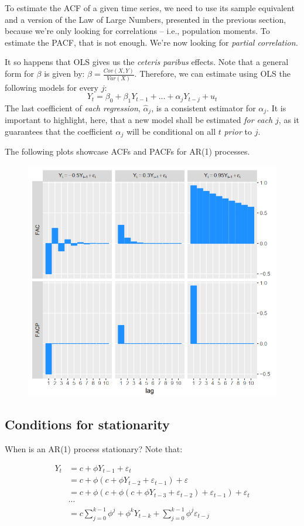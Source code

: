 \documentclass[11pt, a4paper]{report}
\theoremstyle{plain}
\theoremstyle{plain}
\theoremstyle{remark}
\begin{document}
To estimate the ACF of a given time series, we need to use its sample equivalent and a version of the Law of Large Numbers, presented in the previous section, because we're only looking for correlations -- i.e., population moments. To estimate the PACF, that is not enough. We're now looking for \textit{partial correlation.} 

It so happens that OLS gives us the \textit{ceteris paribus} effects. Note that a general form for $\beta$ is given by: $ \beta = \frac{Cov(X,Y)}{Var(X)}$. Therefore, we can estimate using OLS the following models for every $j$: 
$$ Y_t = \beta_0 + \beta_1 Y_{t-1} + ... + \alpha_j Y_{t-j} + u_t $$
The last coefficient of \textit{each regression}, $\hat{\alpha}_j$, is a consistent estimator for $\alpha_{j}$. It is important to highlight, here, that a new model shall be estimated \textit{for each $j$}, as it guarantees that the coefficient $\alpha_{j}$ will be conditional on all $t$ \textit{prior} to $j$.

The following plots showcase ACFs and PACFs for AR(1) processes.

\begin{figure}[h!]
	\centering
	\includegraphics[width=0.6\linewidth]{"fac facp ar1"}
	\label{fig:fac-facp-ar1}
\end{figure}

\subsection{Conditions for stationarity}

When is an AR(1) process stationary? Note that:

$$
\begin{aligned}
	Y_{t} &=c+\phi Y_{t-1}+\varepsilon_{t} \\
	&=c+\phi\left(c+\phi Y_{t-2}+\varepsilon_{t-1}\right)+\varepsilon \\
	&=c+\phi\left(c+\phi\left(c+\phi Y_{t-3}+\varepsilon_{t-2}\right)+\varepsilon_{t-1}\right)+\varepsilon_{t} \\
	& \cdots \\
	&=c \sum_{j=0}^{k-1} \phi^{j}+\phi^{k} Y_{t-k}+\sum_{j=0}^{k-1} \phi^{j} \varepsilon_{t-j}
\end{aligned}
$$
\end{document}
